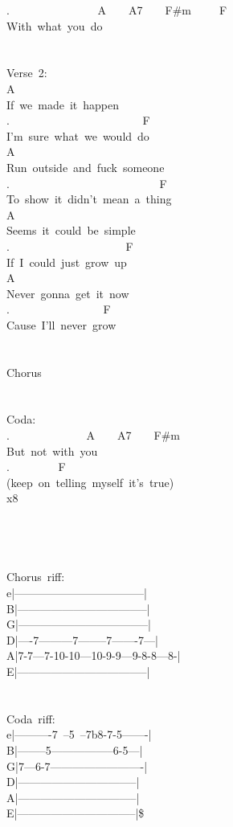 {. \ \ \ \ \ \ \ \ \ \ \ \ \ \ \ A\ \ \ \ A7\ \ \ \ F\#m\ \ \ \ \ F\ \ \\
With\ what\ you\ do\\
\\
\\
Verse\ 2:\\
A\\
If\ we\ made\ it\ happen\\
. \ \ \ \ \ \ \ \ \ \ \ \ \ \ \ \ \ \ \ \ \ \ \ F\\
I'm\ sure\ what\ we\ would\ do\\
A\\
Run\ outside\ and\ fuck\ someone\\
. \ \ \ \ \ \ \ \ \ \ \ \ \ \ \ \ \ \ \ \ \ \ \ \ \ \ F\\
To\ show\ it\ didn't\ mean\ a\ thing\\
A\\
Seems\ it\ could\ be\ simple\\
. \ \ \ \ \ \ \ \ \ \ \ \ \ \ \ \ \ \ \ \ F\\
If\ I\ could\ just\ grow\ up\\
A\\
Never\ gonna\ get\ it\ now\\
. \ \ \ \ \ \ \ \ \ \ \ \ \ \ \ \ F\\
Cause\ I'll\ never\ grow\\
\\
\\
Chorus\\
\\
\\
Coda:\\
. \ \ \ \ \ \ \ \ \ \ \ \ \ A\ \ \ \ A7\ \ \ \ F\#m\\
But\ not\ with\ you\\
. \ \ \ \ \ \ \ \ F\\
(keep\ on\ telling\ myself\ it's\ true)\\
x8\\
\\
\\
\\
\\
Chorus\ riff:\\
e|-----------------------------------|\\
B|-----------------------------------|\\
G|-----------------------------------|\\
D|----7---------7--------7-------7---|\\
A|7-7---7-10-10---10-9-9---9-8-8---8-|\\
E|-----------------------------------|\\
\\
\\
Coda\ riff:\\
e|----------7~--5~--7b8-7-5-------|\\
B|--------5-----------------6-5---|\\
G|7---6-7-------------------------|\\
D|--------------------------------|\\
A|--------------------------------|\\
E|--------------------------------|\$}
